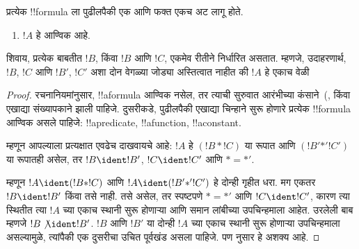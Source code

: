 \documentclass[../../../include/open-logic-section]{subfiles}
\begin{document}
\begin{prop}[एकमेव वाचनीयता]
प्रत्येक !!{formula} ला पुढीलपैकी एक आणि फक्त एकच अट लागू होते.
\begin{enumerate}
\item $!A$ हे आण्विक आहे.







\end{enumerate}
शिवाय, प्रत्येक बाबतीत $!B$, किंवा $!B$ आणि $!C$, एकमेव रीतीने
निर्धारित असतात. म्हणजे, उदाहरणार्थ, $!B$, $!C$ आणि $!B'$, $!C'$ अशा
दोन वेगळ्या जोड्या अस्तित्वात नाहीत की $!A$ हे एकाच वेळी
\end{prop}

\begin{proof}
रचनानियमांनुसार, !!a{formula} आण्विक नसेल, तर त्याची सुरुवात आरंभीच्या
कंसाने~(,  किंवा एखाद्या संख्यापकाने झाली
पाहिजे. दुसरीकडे, पुढीलपैकी एखाद्या चिन्हाने सुरू होणारे प्रत्येक
!!{formula} आण्विक असले पाहिजे: !!a{predicate}, !!a{function},
!!a{constant}.

म्हणून आपल्याला प्रत्यक्षात एवढेच दाखवायचे आहे: $!A$ हे $(!B \ast
!C)$ या रूपात आणि $(!B' \mathbin{\ast'} !C')$ या रूपातही असेल, तर
$!B \ident !B'$, $!C \ident !C'$ आणि $\ast = {\ast'}$.

म्हणून $!A \ident (!B \ast !C)$ आणि $!A \ident (!B'
\mathbin{\ast'} !C')$ हे दोन्ही गृहीत धरा. मग एकतर $!B \ident !B'$
किंवा तसे नाही. तसे असेल, तर स्पष्टपणे $\ast = {\ast'}$ आणि $!C
\ident !C'$, कारण त्या स्थितीत त्या $!A$ च्या एकाच स्थानी सुरू होणाऱ्या
आणि समान लांबीच्या उपचिन्हमाला आहेत. उरलेली बाब म्हणजे $!B
\not\ident !B'$. $!B$ आणि $!B'$ या दोन्ही $!A$ च्या एकाच स्थानी सुरू
होणाऱ्या उपचिन्हमाला असल्यामुळे, त्यांपैकी एक दुसरीचा उचित पूर्वखंड
असला पाहिजे. पण  नुसार हे अशक्य आहे.
\end{proof}
\end{document}
